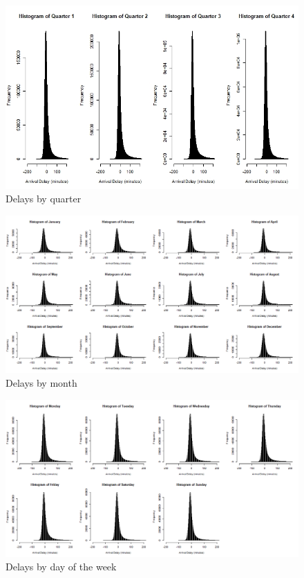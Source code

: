 \documentclass[12pt, a4paper, openany]{book}
\begin{document}
			\begin{figure}[h]
			\centering
	 		\includegraphics[width = 1 \textwidth]{../figures/PLOTS FOR REPORT/Chapter 4/Figure 4.31}
	 		\caption{Delays by quarter}
	 		\end{figure}

			\begin{figure}[h]
			\centering
	 		\includegraphics[width =1\textwidth]{../figures/PLOTS FOR REPORT/Chapter 4/Figure 4.32}
	 		\caption{Delays by month}
	 		\end{figure}

			\begin{figure}[h]
			\centering
	 		\includegraphics[width = 1 \textwidth]{../figures/PLOTS FOR REPORT/Chapter 4/Figure 4.33}
	 		\caption{Delays by day of the week}
	 		\end{figure}
\end{document}
